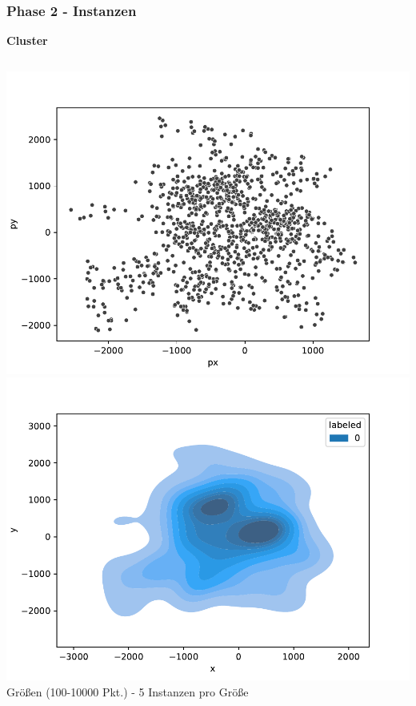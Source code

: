 \documentclass[aspectratio=169]{beamer}
\begin{document}
\begin{frame}
	\frametitle{Phase 2 - Instanzen}
	\textbf{Cluster}
	\begin{columns}[c] %
		
		\includegraphics[scale=.41]{scatter_1000_cl0.pdf}
		\includegraphics[scale=.41]{density_1000_cl0.pdf}\\
		 Größen (100-10000 Pkt.) - 5 Instanzen pro Größe 
		
	
	\end{columns}
	\end{frame}
	
\end{document}
